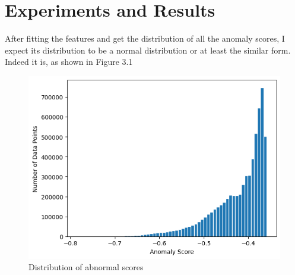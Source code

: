 \section{Experiments and Results}
\newpage

After fitting the features and get the distribution of all the anomaly scores, I expect its distribution to be a normal distribution or at least the similar form. Indeed it is, as shown in Figure 3.1

\begin{figure}
  \centering
  \includegraphics[width=\linewidth]{body/03_experiment_result/img/figure1.png}
  \caption{Distribution of abnormal scores}
\end{figure}

